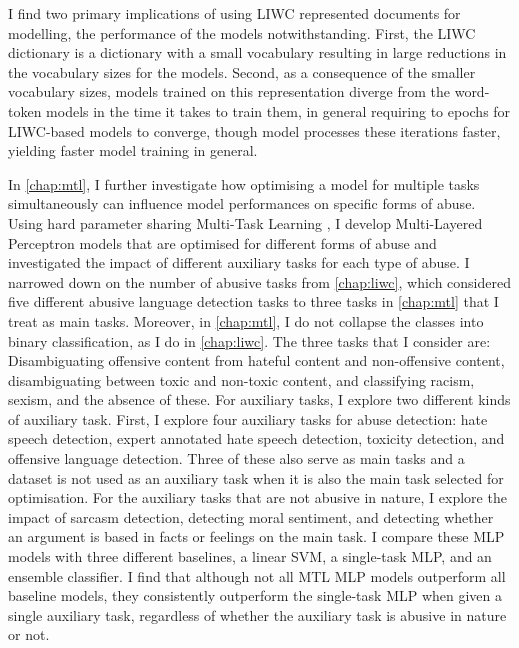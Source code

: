 I find two primary implications of using LIWC represented documents for modelling, the performance of the models notwithstanding.
First, the LIWC dictionary is a dictionary with a small vocabulary resulting in large reductions in the vocabulary sizes for the models.
Second, as a consequence of the smaller vocabulary sizes, models trained on this representation diverge from the word-token models in the time it takes to train them, in general requiring to epochs for LIWC-based models to converge, though model processes these iterations faster, yielding faster model training in general.









In \cref{chap:mtl}, I further investigate how optimising a model for multiple tasks simultaneously can influence model performances on specific forms of abuse.
Using hard parameter sharing Multi-Task Learning \citep{Caruana:1993}, I develop Multi-Layered Perceptron models that are optimised for different forms of abuse and investigated the impact of different auxiliary tasks for each type of abuse.
I narrowed down on the number of abusive tasks from \cref{chap:liwc}, which considered five different abusive language detection tasks to three tasks in \cref{chap:mtl} that I treat as main tasks.
Moreover, in \cref{chap:mtl}, I do not collapse the classes into binary classification, as I do in \cref{chap:liwc}.
The three tasks that I consider are: Disambiguating offensive content from hateful content and non-offensive content, disambiguating between toxic and non-toxic content, and classifying racism, sexism, and the absence of these.
For auxiliary tasks, I explore two different kinds of auxiliary task.
First, I explore four auxiliary tasks for abuse detection: hate speech detection, expert annotated hate speech detection, toxicity detection, and offensive language detection.
Three of these also serve as main tasks and a dataset is not used as an auxiliary task when it is also the main task selected for optimisation.
For the auxiliary tasks that are not abusive in nature, I explore the impact of sarcasm detection, detecting moral sentiment, and detecting whether an argument is based in facts or feelings on the main task.
I compare these MLP models with three different baselines, a linear SVM, a single-task MLP, and an ensemble classifier.
I find that although not all MTL MLP models outperform all baseline models, they consistently outperform the single-task MLP when given a single auxiliary task, regardless of whether the auxiliary task is abusive in nature or not.
